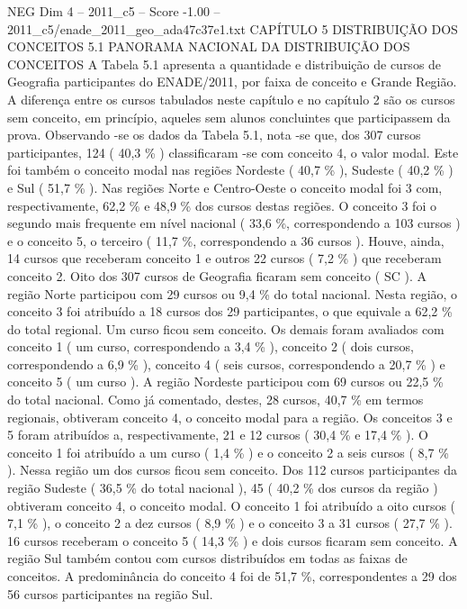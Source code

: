 \begin{textsample}{NEG Dim 4 – 2011\_c5 – Score -1.00 – 2011\_c5/enade\_2011\_geo\_ada47c37e1.txt}  \label{ex:f4_neg_120}
CAPÍTULO 5 DISTRIBUIÇÃO DOS CONCEITOS 5.1 PANORAMA NACIONAL DA DISTRIBUIÇÃO DOS CONCEITOS A Tabela 5.1 apresenta a quantidade e distribuição de cursos de Geografia participantes do ENADE/2011, por faixa de conceito e Grande Região.
A diferença entre os cursos tabulados neste capítulo e no capítulo 2 são os cursos sem conceito, em princípio, aqueles sem alunos concluintes que participassem da prova.
Observando -se os dados da Tabela 5.1, nota -se que, dos 307 cursos participantes, 124 ( 40,3 \% ) classificaram -se com conceito 4, o valor modal.
Este foi também o conceito modal nas regiões Nordeste ( 40,7 \% ), Sudeste ( 40,2 \% ) e Sul ( 51,7 \% ).
Nas regiões Norte e Centro-Oeste o conceito modal foi 3 com, respectivamente, 62,2 \% e 48,9 \% dos cursos destas regiões.
O conceito 3 foi o segundo mais frequente em nível nacional ( 33,6 \%, correspondendo a 103 cursos ) e o conceito 5, o terceiro ( 11,7 \%, correspondendo a 36 cursos ).
Houve, ainda, 14 cursos que receberam conceito 1 e outros 22 cursos ( 7,2 \% ) que receberam conceito 2.
Oito dos 307 cursos de Geografia ficaram sem conceito ( SC ).
A região Norte participou com 29 cursos ou 9,4 \% do total nacional.
Nesta região, o conceito 3 foi atribuído a 18 cursos dos 29 participantes, o que equivale a 62,2 \% do total regional.
Um curso ficou sem conceito.
Os demais foram avaliados com conceito 1 ( um curso, correspondendo a 3,4 \% ), conceito 2 ( dois cursos, correspondendo a 6,9 \% ), conceito 4 ( seis cursos, correspondendo a 20,7 \% ) e conceito 5 ( um curso ).
A região Nordeste participou com 69 cursos ou 22,5 \% do total nacional.
Como já comentado, destes, 28 cursos, 40,7 \% em termos regionais, obtiveram conceito 4, o conceito modal para a região.
Os conceitos 3 e 5 foram atribuídos a, respectivamente, 21 e 12 cursos ( 30,4 \% e 17,4 \% ).
O conceito 1 foi atribuído a um curso ( 1,4 \% ) e o conceito 2 a seis cursos ( 8,7 \% ).
Nessa região um dos cursos ficou sem conceito.
Dos 112 cursos participantes da região Sudeste ( 36,5 \% do total nacional ), 45 ( 40,2 \% dos cursos da região ) obtiveram conceito 4, o conceito modal.
O conceito 1 foi atribuído a oito cursos ( 7,1 \% ), o conceito 2 a dez cursos ( 8,9 \% ) e o conceito 3 a 31 cursos ( 27,7 \% ). 16 cursos receberam o conceito 5 ( 14,3 \% ) e dois cursos ficaram sem conceito.
A região Sul também contou com cursos distribuídos em todas as faixas de conceitos.
A predominância do conceito 4 foi de 51,7 \%, correspondentes a 29 dos 56 cursos participantes na região Sul.

\end{textsample}
